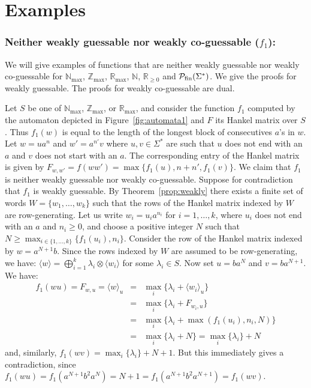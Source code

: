 \documentclass[10pt,a4paper]{amsart}
\theoremstyle{definition}
\numberwithin{equation}{section}
\numberwithin{theorem}{section}
\begin{document}
\section{Examples}
\label{appendix:examples}

	\subsubsection*{\textbf{Neither weakly guessable nor weakly co-guessable ($f_1$):}}
	We will give examples of functions that are neither weakly guessable nor weakly co-guessable for $\mathbb{N}_{\max}$, $\mathbb{Z}_{\max}$, $\mathbb{R}_{\max}$, $\mathbb{N}$, $\mathbb{R}_{\geq 0}$ and $\mathcal{P}_{\rm fin}(\Sigma^*)$. We give the proofs for weakly guessable. The proofs for weakly co-guessable are dual.
	
	Let $S$ be one of $\mathbb{N}_{\max}$, $\mathbb{Z}_{\max}$, or $\mathbb{R}_{\max}$, and consider the function $f_1$ computed by the automaton depicted in Figure~\ref{fig:automata1} and $F$ its Hankel matrix over $S$. Thus $f_1(w)$ is equal to the length of the longest block of consecutives $a$'s in $w$. Let $w = ua^n$ and $w'=a^{n'}v$ where $u, v \in\Sigma^*$ are such that $u$ does not end with an $a$ and $v$ does not start with an $a$. The corresponding entry of the Hankel matrix is given by $F_{w,w'} =f(ww') = {\max}\{f_1(u), n+n', f_1(v)\}$. We claim that $f_1$ is neither weakly guessable nor weakly co-guessable. Suppose for contradiction that $f_1$ is weakly guessable. By Theorem~\ref{prop:weakly} there exists a finite set of words $W=\{w_1, \ldots ,w_k\}$ such that the rows of the Hankel matrix indexed by $W$ are row-generating. Let us write $w_i = u_ia^{n_i}$ for $i=1, \ldots ,k$, where $u_i$ does not end with an $a$ and $n_i \geq 0$, and choose a positive integer $N$ such that $N\geq {\max}_{i \in \{1,\ldots,k\}}\{f_1(u_i), n_i\}$. Consider the row of the Hankel matrix indexed by $w=a^{N+1}b$. Since the rows indexed by $W$ are assumed to be row-generating, we have:
	$\langle w \rangle = \bigoplus_{i=1}^k \lambda_i \otimes \langle w_i \rangle$ for some $\lambda_i \in S$. Now set $u = ba^{N}$ and $v=ba^{N+1}$. We have:
	\begin{eqnarray*}
		f_1(wu) = F_{w,u} = \langle w \rangle_u &=& {\max}_{i}\{\lambda_i + \langle w_i \rangle_ u\}\\
		&=& {\max}_{i}\{\lambda_i + F_{w_i, u}\}\\
		&=& {\max}_{i}\{\lambda_i + \max(f_1(u_i), n_i, N)\}\\
		&=& {\max}_{i}\{\lambda_i + N\} = {\max}_{i}\{\lambda_i\} + N  
	\end{eqnarray*} 
	and, similarly, $f_1(wv) = {\max}_{i}\{\lambda_i\} + N +1$.  But this immediately gives a contradiction, since $f_1(wu) = f_1(a^{N+1}b^2a^N) = N+1 = f_1(a^{N+1}b^2a^{N+1}) = f_1(wv)$.
	
\end{document}
